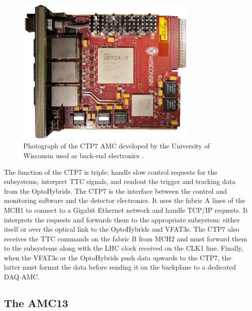       \begin{figure}[t!]
        \centering
        \includegraphics[width=0.8\textwidth]{img/II-2-daq/ctp7.png}
        \caption{Photograph of the CTP7 AMC developed by the University of Wisconsin used as back-end electronics \cite{CTP7}.}
        \label{fig:II-2-ctp7}
      \end{figure}

      The function of the CTP7 is triple: handle slow control requests for the subsystems, interpret TTC signals, and readout the trigger and tracking data from the OptoHybrids. The CTP7 is the interface between the control and monitoring software and the detector electronics. It uses the fabric A lines of the MCH1 to connect to a Gigabit Ethernet network and handle TCP/IP requests. It interprets the requests and forwards them to the appropriate subsystem: either itself or over the optical link to the OptoHybrids and VFAT3s. The CTP7 also receives the TTC commands on the fabric B from MCH2 and must forward them to the subsystems along with the LHC clock received on the CLK1 line. Finally, when the VFAT3s or the OptoHybrids push data upwards to the CTP7, the latter must format the data before sending it on the backplane to a dedicated DAQ AMC.

    \subsection{The AMC13}

